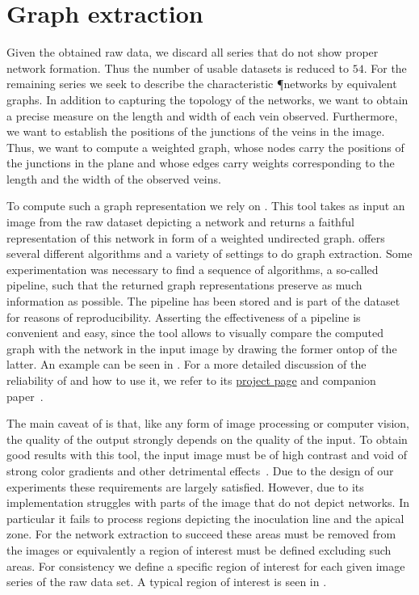 	\section{Graph extraction}

		Given the obtained raw data, we discard all series that do not show proper network formation. Thus the number of usable datasets is reduced to $54$. For the remaining series we seek to describe the characteristic \P networks by equivalent graphs. In addition to capturing the topology of the networks, we want to obtain a precise measure on the length and width of each vein observed. Furthermore, we want to establish the positions of the junctions of the veins in the image. Thus, we want to compute a weighted graph, whose nodes carry the positions of the junctions in the plane and whose edges carry weights corresponding to the length and the width of the observed veins. 

		To compute such a graph representation we rely on \NEFI. This tool takes as input an image from the raw dataset depicting a network and returns a faithful representation of this network in form of a weighted undirected graph. \NEFI offers several different algorithms and a variety of settings to do graph extraction. Some experimentation was necessary to find a sequence of algorithms, a so-called pipeline, such that the returned graph representations preserve as much information as possible. The pipeline has been stored and is part of the dataset for reasons of reproducibility. Asserting the effectiveness of a pipeline is convenient and easy, since the tool allows to visually compare the computed graph with the network in the input image by drawing the former ontop of the latter. An example can be seen in . For a more detailed discussion of the reliability of \NEFI and how to use it, we refer to its \href{http://nefi.mpi-inf.mpg.de}{project page} and companion paper~\cite{dirnberger2015nefi}.

		The main caveat of \NEFI is that, like any form of image processing or computer vision, the quality of the output strongly depends on the quality of the input. To obtain good results with this tool, the input image must be of high contrast and void of strong color gradients and other detrimental effects~\cite{dirnberger2015nefi}. Due to the design of our experiments these requirements are largely satisfied. However, due to its implementation \NEFI struggles with parts of the image that do not depict networks. In particular it fails to process regions depicting the inoculation line and the apical zone. For the network extraction to succeed these areas must be removed from the images or equivalently a region of interest must be defined excluding such areas. For consistency we define a specific region of interest for each given image series of the raw data set. A typical region of interest is seen in .

